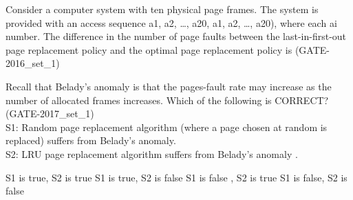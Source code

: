 
\begin{questyle}

  \question  Consider a computer system with ten physical page frames. The system is provided with an access sequence a1, a2, …, a20, a1, a2, …, a20), where each ai number. The difference in the number of page faults between the last-in-first-out page replacement policy and the optimal page replacement policy is \fillin[1] (GATE-2016\_set\_1)

\end{questyle}


\begin{questyle}

  \question  Recall that Belady’s anomaly is that the pages-fault rate may increase as the number of allocated
            frames increases. Which of the following is CORRECT? (GATE-2017\_set\_1) \\
            S1: Random page replacement algorithm (where a page chosen at random is replaced) suffers from Belady’s anomaly.\\
            S2: LRU page replacement algorithm suffers from Belady’s anomaly . \\
  \begin{choices}
    \choice S1 is true, S2 is true
    \correctchoice S1 is true, S2 is false
    \choice S1 is false , S2 is true
    \choice S1 is false, S2 is false
  \end{choices}

\end{questyle}












